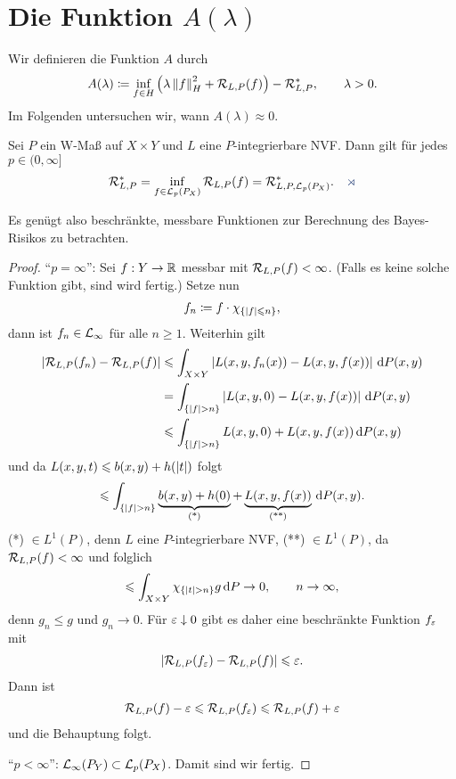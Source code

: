 \section{Die Funktion $A(\lambda)$}

Wir definieren die Funktion $A$ durch
\begin{align*}
A(\lambda) \coloneq \inf_{f\in H} \left(\lambda\left\|f\right\|_H^2 + \mathcal{R}_{L,P}(f) \right) -
\mathcal{R}_{L,P}^*,\qquad \lambda > 0.
\end{align*}
Im Folgenden untersuchen wir, wann $A(\lambda)\approx 0$.

\begin{prop}
\label{prop:6.3.1}
Sei $P$ ein W-Maß auf $X\times Y$ und $L$ eine $P$-integrierbare NVF. Dann gilt
für jedes $p\in (0,\infty]$
\begin{align*}
\RR_{L,P}^* =
\inf_{f\in\LL_p(P_X)}\RR_{L,P}(f) = \RR_{L,P,\LL_p(P_X)}^*.\fishhere
\end{align*}
\end{prop}

Es genügt also beschränkte, messbare Funktionen zur Berechnung des Bayes-Risikos
zu betrachten.

\begin{proof}
"`$p=\infty$"': Sei $f: Y\to \mathbb{R}$ messbar mit $\mathcal{R}_{L,P}(f)  < \infty$. (Falls es
keine solche Funktion gibt, sind wird fertig.) Setze nun
\begin{align*}
f_n \coloneq f\cdot \chi_{\left\{ \left|f\right|\leqslant n \right\}},
\end{align*}
dann ist $f_n\in \mathcal{L}_\infty$ für alle $n\ge 1$. Weiterhin gilt
\begin{align*}
\left|\mathcal{R}_{L,P}(f_n)-\mathcal{R}_{L,P}(f)\right| &\leqslant 
\int_{X\times Y} \left|L(x,y,f_n(x))-L(x,y,f(x))\right|\,\mathrm{d} P(x,y)\\
&= 
\int_{\left\{ \left|f\right| > n \right\}} \left|L(x,y,0)-L(x,y,f(x))\right| \,\mathrm{d} P(x,y)\\
&\leqslant
\int_{\left\{ \left|f\right| > n \right\}} L(x,y,0)+L(x,y,f(x)) \,\mathrm{d} P(x,y)
\end{align*}
und da $L(x,y,t)\leqslant b(x,y) + h(\left|t\right|)$ folgt
\begin{align*}
\leqslant \int_{\left\{ \left|f\right| > n \right\}} \underbrace{b(x,y)+ h(0)}_{\text{(*)}} +
\underbrace{L(x,y,f(x))}_{\text{(**)}} \,\mathrm{d} P(x,y).
\end{align*}
(*) $\in L^1(P)$, denn $L$ eine $P$-integrierbare NVF, (**) $\in L^1(P)$, da
$\mathcal{R}_{L,P}(f) < \infty$ und folglich
\begin{align*}
\le \int_{X\times Y} \chi_{\setd{\abs{t}> n}} g \dP \to 0,\qquad n\to\infty,
\end{align*}
denn $g_n\le g$ und $g_n\to 0$. Für $\varepsilon\downarrow 0$ gibt es daher eine
beschränkte Funktion $f_\varepsilon$ mit
\begin{align*}
\left|\mathcal{R}_{L,P}(f_\varepsilon)-\mathcal{R}_{L,P}(f)\right| \leqslant \varepsilon.
\end{align*}
Dann ist
\begin{align*}
\mathcal{R}_{L,P}(f) - \varepsilon \leqslant \mathcal{R}_{L,P}(f_\varepsilon) \leqslant \mathcal{R}_{L,P}(f) + \varepsilon
\end{align*}
und die Behauptung folgt.

"`$p<\infty$"': $\mathcal{L}_\infty(P_Y) \subset \mathcal{L}_p(P_X)$. Damit sind wir
fertig.\qedhere
\end{proof}

